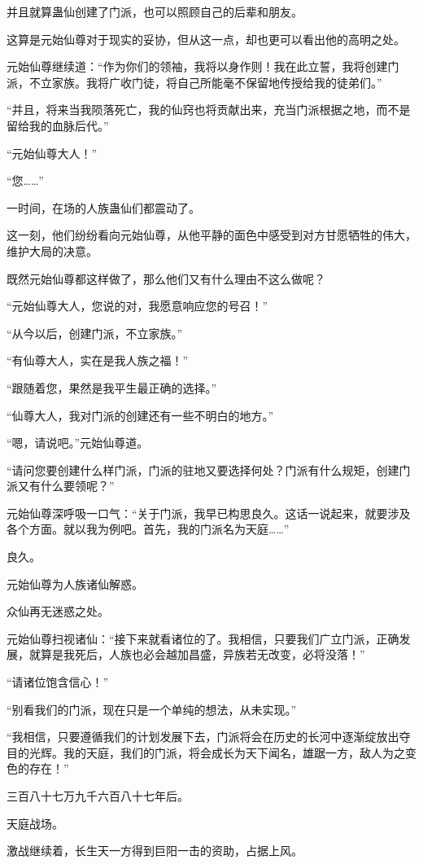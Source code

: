 \begin{this_body}
并且就算蛊仙创建了门派，也可以照顾自己的后辈和朋友。

这算是元始仙尊对于现实的妥协，但从这一点，却也更可以看出他的高明之处。

元始仙尊继续道：“作为你们的领袖，我将以身作则！我在此立誓，我将创建门派，不立家族。我将广收门徒，将自己所能毫不保留地传授给我的徒弟们。”

“并且，将来当我陨落死亡，我的仙窍也将贡献出来，充当门派根据之地，而不是留给我的血脉后代。”

“元始仙尊大人！”

“您……”

一时间，在场的人族蛊仙们都震动了。

这一刻，他们纷纷看向元始仙尊，从他平静的面色中感受到对方甘愿牺牲的伟大，维护大局的决意。

既然元始仙尊都这样做了，那么他们又有什么理由不这么做呢？

“元始仙尊大人，您说的对，我愿意响应您的号召！”

“从今以后，创建门派，不立家族。”

“有仙尊大人，实在是我人族之福！”

“跟随着您，果然是我平生最正确的选择。”

“仙尊大人，我对门派的创建还有一些不明白的地方。”

“嗯，请说吧。”元始仙尊道。

“请问您要创建什么样门派，门派的驻地又要选择何处？门派有什么规矩，创建门派又有什么要领呢？”

元始仙尊深呼吸一口气：“关于门派，我早已构思良久。这话一说起来，就要涉及各个方面。就以我为例吧。首先，我的门派名为天庭……”

良久。

元始仙尊为人族诸仙解惑。

众仙再无迷惑之处。

元始仙尊扫视诸仙：“接下来就看诸位的了。我相信，只要我们广立门派，正确发展，就算是我死后，人族也必会越加昌盛，异族若无改变，必将没落！”

“请诸位饱含信心！”

“别看我们的门派，现在只是一个单纯的想法，从未实现。”

“我相信，只要遵循我们的计划发展下去，门派将会在历史的长河中逐渐绽放出夺目的光辉。我的天庭，我们的门派，将会成长为天下闻名，雄踞一方，敌人为之变色的存在！”

三百八十七万九千六百八十七年后。

天庭战场。

激战继续着，长生天一方得到巨阳一击的资助，占据上风。


\end{this_body}
